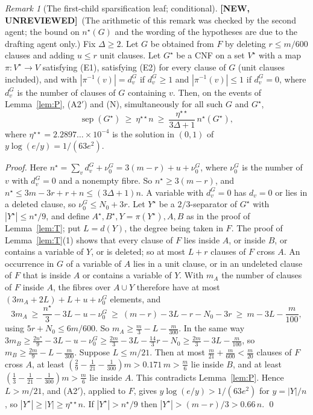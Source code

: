 \documentclass[11pt,a4paper]{article}
\newcommand{\NEWU}{\textbf{[NEW, UNREVIEWED]}}
\theoremstyle{definition}
\theoremstyle{remark}
\newtheorem{remark}[theorem]{Remark}
\newcommand{\sep}{\operatorname{sep}}
\begin{document}
\begin{remark}[The first-child sparsification leaf; conditional]\label{rem:leaves}
\NEWU\ (The arithmetic of this remark was checked by the second agent; the bound on
$n^\star(G)$ and the wording of the hypotheses are due to the drafting agent only.)
Fix $\Delta\ge2$. Let $G$ be obtained from $F$ by deleting $r\le m/600$ clauses and adding
$u\le r$ unit clauses. Let $G^\star$ be a CNF on a set $V^\star$ with a map
$\pi:V^\star\to V$ satisfying (E1), satisfying (E2) for every clause of $G$ (unit clauses
included), and with $|\pi^{-1}(v)|=d^G_v$ if $d^G_v\ge1$ and $|\pi^{-1}(v)|\le1$ if
$d^G_v=0$, where $d^G_v$ is the number of clauses of $G$ containing $v$. Then, on the events
of Lemma~\ref{lem:P}, \textup{(A2$'$)} and \textup{(N)}, simultaneously for all such $G$ and
$G^\star$,
\[
\sep(G^\star)\ \ge\ \eta^{\star\star}n\ \ge\ \frac{\eta^{\star\star}}{3\Delta+1}\,n^\star(G^\star),
\]
where $\eta^{\star\star}=2.2897\ldots\times10^{-4}$ is the solution in $(0,1)$ of
$y\log(e/y)=1/(63e^2)$.

\emph{Proof.} Here $n^\star=\sum_vd^G_v+\nu^G_0=3(m-r)+u+\nu^G_0$, where $\nu^G_0$ is the
number of $v$ with $d^G_v=0$ and a nonempty fibre. So $n^\star\ge3(m-r)$, and
$n^\star\le3m-3r+r+n\le(3\Delta+1)n$. A variable with $d^G_v=0$ has $d_v=0$ or lies in a
deleted clause, so $\nu^G_0\le N_0+3r$. Let $Y^\star$ be a $2/3$-separator of $G^\star$ with
$|Y^\star|\le n^\star/9$, and define $A^\star,B^\star,Y=\pi(Y^\star),A,B$ as in the proof of
Lemma~\ref{lem:T}; put $L=d(Y)$, the degree being taken in $F$. The proof of
Lemma~\ref{lem:T}(1) shows that every clause of $F$ lies inside $A$, or inside $B$, or
contains a variable of $Y$, or is deleted; so at most $L+r$ clauses of $F$ cross $A$. An
occurrence in $G$ of a variable of $A$ lies in a unit clause, or in an undeleted clause of
$F$ that is inside $A$ or contains a variable of $Y$. With $m_A$ the number of clauses of
$F$ inside $A$, the fibres over $A\cup Y$ therefore have at most
$(3m_A+2L)+L+u+\nu^G_0$ elements, and
\[
3m_A\ \ge\ \frac{n^\star}3-3L-u-\nu^G_0\ \ge\ (m-r)-3L-r-N_0-3r\ \ge\ m-3L-\frac{m}{100},
\]
using $5r+N_0\le6m/600$. So $m_A\ge\frac m3-L-\frac m{300}$. In the same way
$3m_B\ge\frac{2n^\star}9-3L-u-\nu^G_0\ge\frac{2m}3-3L-\frac{14}3r-N_0\ge\frac{2m}3-3L-\frac m{100}$,
so $m_B\ge\frac{2m}9-L-\frac m{300}$. Suppose $L\le m/21$. Then at most
$\frac m{21}+\frac m{600}<\frac m{20}$ clauses of $F$ cross $A$, at least
$(\frac29-\frac1{21}-\frac1{300})m>0.171\,m>\frac m6$ lie inside $B$, and at least
$(\frac13-\frac1{21}-\frac1{300})m>\frac m6$ lie inside $A$. This contradicts Lemma~\ref{lem:P}. Hence $L>m/21$, and (A2$'$), applied to
$F$, gives $y\log(e/y)>1/(63e^2)$ for $y=|Y|/n$, so $|Y^\star|\ge|Y|\ge\eta^{\star\star}n$.
If $|Y^\star|>n^\star/9$ then $|Y^\star|>(m-r)/3>0.66\,n$. \qed


\end{remark}
\end{document}

